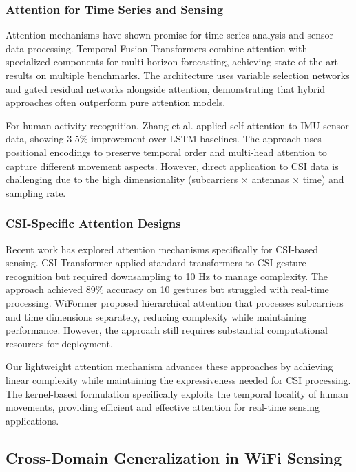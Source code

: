 \documentclass[10pt,journal,compsoc]{IEEEtran}
\begin{document}
\subsubsection{Attention for Time Series and Sensing}

Attention mechanisms have shown promise for time series analysis and sensor data processing. Temporal Fusion Transformers \cite{lim2021tft} combine attention with specialized components for multi-horizon forecasting, achieving state-of-the-art results on multiple benchmarks. The architecture uses variable selection networks and gated residual networks alongside attention, demonstrating that hybrid approaches often outperform pure attention models.

For human activity recognition, Zhang et al. \cite{zhang2021attention} applied self-attention to IMU sensor data, showing 3-5\% improvement over LSTM baselines. The approach uses positional encodings to preserve temporal order and multi-head attention to capture different movement aspects. However, direct application to CSI data is challenging due to the high dimensionality (subcarriers × antennas × time) and sampling rate.

\subsubsection{CSI-Specific Attention Designs}

Recent work has explored attention mechanisms specifically for CSI-based sensing. CSI-Transformer \cite{csitransformer2022} applied standard transformers to CSI gesture recognition but required downsampling to 10 Hz to manage complexity. The approach achieved 89\% accuracy on 10 gestures but struggled with real-time processing. WiFormer \cite{wiformer2023} proposed hierarchical attention that processes subcarriers and time dimensions separately, reducing complexity while maintaining performance. However, the approach still requires substantial computational resources for deployment.

Our lightweight attention mechanism advances these approaches by achieving linear complexity while maintaining the expressiveness needed for CSI processing. The kernel-based formulation specifically exploits the temporal locality of human movements, providing efficient and effective attention for real-time sensing applications.

\subsection{Cross-Domain Generalization in WiFi Sensing}
\end{document}
